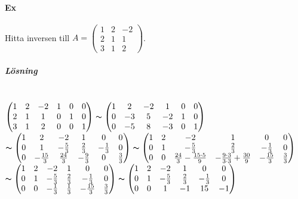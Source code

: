 \begin{figure*}
\paragraph{Ex} Hitta inversen till $A=\begin{pmatrix}1&2&-2\\2&1&1\\3&1&2\end{pmatrix}$.
\subparagraph{Lösning}~\\
$\begin{pmatrix}
    1&2&-2&1&0&0\\
    2&1&1&0&1&0\\
    3&1&2&0&0&1
\end{pmatrix}
\thicksim
\begin{pmatrix}
    1&2&-2&1&0&0\\
    0&-3&5&-2&1&0\\
    0&-5&8&-3&0&1
\end{pmatrix}
$\\

$\thicksim
\begin{pmatrix}
    1&2&-2&1&0&0\\
    0&1&-\frac{5}{3}&\frac{2}{3}&-\frac{1}{3}&0\\
    0&-\frac{15}{3}&\frac{24}{3}&-\frac{9}{3}&0&\frac{3}{3}
\end{pmatrix}
\thicksim
\begin{pmatrix}
    1&2&-2&1&0&0\\
    0&1&-\frac{5}{3}&\frac{2}{3}&-\frac{1}{3}&0\\
    0&0&\frac{24}{3}-\frac{15\cdot 5}{9}&-\frac{9\cdot 3}{3\cdot 3}+\frac{30}{9}&-\frac{15}{3}&\frac{3}{3}
\end{pmatrix}
$\\

$\thicksim
\begin{pmatrix}
    1&2&-2&1&0&0\\
    0&1&-\frac{5}{3}&\frac{2}{3}&-\frac{1}{3}&0\\
    0&0&-\frac{1}{3}&\frac{1}{3}&-\frac{15}{3}&\frac{3}{3}
\end{pmatrix}
\thicksim
\begin{pmatrix}
    1&2&-2&1&0&0\\
    0&1&-\frac{5}{3}&\frac{2}{3}&-\frac{1}{3}&0\\
    0&0&1&-1&15&-1  
\end{pmatrix}
$\\


\end{figure*}
